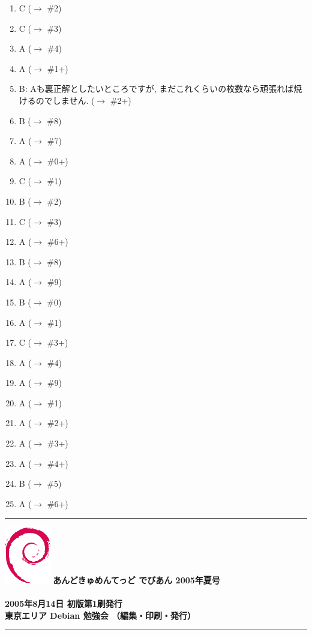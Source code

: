 \documentclass[mingoth,a4paper]{jsarticle}
\begin{document}
\begin{enumerate}
 \item C ($\to$ \#2)
 \item C ($\to$ \#3)
 \item A ($\to$ \#4)
 \item A ($\to$ \#1+)
 \item B: Aも裏正解としたいところですが, まだこれくらいの枚数なら頑張れば焼けるのでしません. ($\to$ \#2+)
 \item B ($\to$ \#8)
 \item A ($\to$ \#7)
 \item A ($\to$ \#0+)
 \item C ($\to$ \#1)
 \item B ($\to$ \#2)
 \item C ($\to$ \#3)
 \item A ($\to$ \#6+)
 \item B ($\to$ \#8)
 \item A ($\to$ \#9)
 \item B ($\to$ \#0)
 \item A ($\to$ \#1)
 \item C ($\to$ \#3+)
 \item A ($\to$ \#4)
 \item A ($\to$ \#9)
 \item A ($\to$ \#1)
 \item A ($\to$ \#2+)
 \item A ($\to$ \#3+)
 \item A ($\to$ \#4+)
 \item B ($\to$ \#5)
 \item A ($\to$ \#6+)
\end{enumerate}


\onecolumn
\newpage

\vspace*{15cm}
\hrule
\vspace{2mm}
\includegraphics[width=2cm]{image200502/openlogo-nd.eps}
\noindent \Large \bf あんどきゅめんてっど でびあん 2005年夏号\\ \\
\noindent \normalfont 2005年8月14日 \hspace{5mm}  初版第1刷発行\\
\noindent \normalfont 東京エリア Debian 勉強会 （編集・印刷・発行）\\
\hrule
\end{document}
